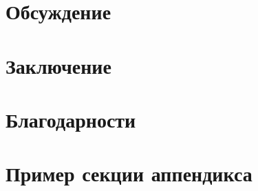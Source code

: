 \documentclass[a4paper,12pt]{extarticle}
\begin{document}
\section{Обсуждение}

\section{Заключение}

\section{Благодарности}

\newpage 
\printbibliography[heading=bibintoc] 


\newpage
\appendix

\section{Пример секции аппендикса}
\end{document}
